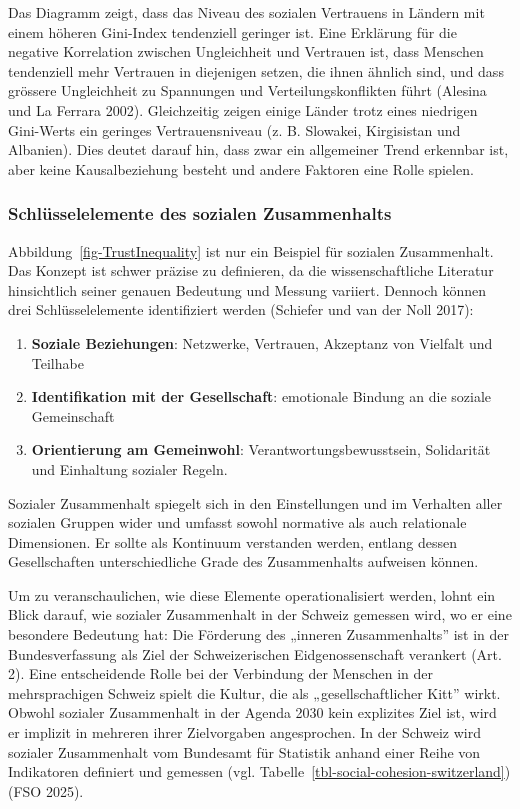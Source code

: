 \documentclass[
  nswissgerman,
  a4paper,
  DIV=11,
  numbers=noendperiod,
  oneside,
  openany]{scrreprt}
\begin{document}
Das Diagramm zeigt, dass das Niveau des sozialen Vertrauens in Ländern
mit einem höheren Gini-Index tendenziell geringer ist. Eine Erklärung
für die negative Korrelation zwischen Ungleichheit und Vertrauen ist,
dass Menschen tendenziell mehr Vertrauen in diejenigen setzen, die ihnen
ähnlich sind, und dass grössere Ungleichheit zu Spannungen und
Verteilungskonflikten führt (Alesina und La Ferrara 2002). Gleichzeitig
zeigen einige Länder trotz eines niedrigen Gini-Werts ein geringes
Vertrauensniveau (z. B. Slowakei, Kirgisistan und Albanien). Dies deutet
darauf hin, dass zwar ein allgemeiner Trend erkennbar ist, aber keine
Kausalbeziehung besteht und andere Faktoren eine Rolle spielen.

\subsubsection{Schlüsselelemente des sozialen
Zusammenhalts}\label{schluxfcsselelemente-des-sozialen-zusammenhalts}

Abbildung~\ref{fig-TrustInequality} ist nur ein Beispiel für sozialen
Zusammenhalt. Das Konzept ist schwer präzise zu definieren, da die
wissenschaftliche Literatur hinsichtlich seiner genauen Bedeutung und
Messung variiert. Dennoch können drei Schlüsselelemente identifiziert
werden ({Schiefer und van der Noll} 2017):

\begin{enumerate}
\def\labelenumi{\arabic{enumi}.}
\item
  \textbf{Soziale Beziehungen}: Netzwerke, Vertrauen, Akzeptanz von
  Vielfalt und Teilhabe
\item
  \textbf{Identifikation mit der Gesellschaft}: emotionale Bindung an
  die soziale Gemeinschaft
\item
  \textbf{Orientierung am Gemeinwohl}: Verantwortungsbewusstsein,
  Solidarität und Einhaltung sozialer Regeln.
\end{enumerate}

Sozialer Zusammenhalt spiegelt sich in den Einstellungen und im
Verhalten aller sozialen Gruppen wider und umfasst sowohl normative als
auch relationale Dimensionen. Er sollte als Kontinuum verstanden werden,
entlang dessen Gesellschaften unterschiedliche Grade des Zusammenhalts
aufweisen können.

Um zu veranschaulichen, wie diese Elemente operationalisiert werden,
lohnt ein Blick darauf, wie sozialer Zusammenhalt in der Schweiz
gemessen wird, wo er eine besondere Bedeutung hat: Die Förderung des
„inneren Zusammenhalts'' ist in der Bundesverfassung als Ziel der
Schweizerischen Eidgenossenschaft verankert (Art. 2). Eine entscheidende
Rolle bei der Verbindung der Menschen in der mehrsprachigen Schweiz
spielt die Kultur, die als „gesellschaftlicher Kitt'' wirkt. Obwohl
sozialer Zusammenhalt in der Agenda 2030 kein explizites Ziel ist, wird
er implizit in mehreren ihrer Zielvorgaben angesprochen. In der Schweiz
wird sozialer Zusammenhalt vom Bundesamt für Statistik anhand einer
Reihe von Indikatoren definiert und gemessen (vgl.
Tabelle~\ref{tbl-social-cohesion-switzerland}) (FSO 2025).
\end{document}
